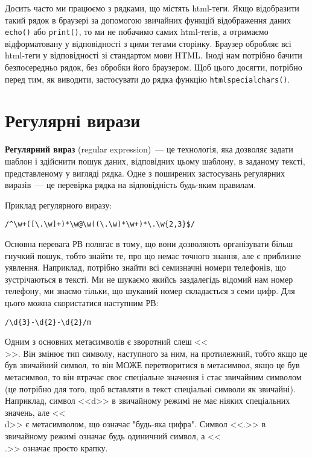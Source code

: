 Досить часто ми працюємо з рядками, що містять html-теги. Якщо відобразити такий рядок в браузері за допомогою звичайних функцій відображення даних \verb'echo()' або \verb'print()', то ми не побачимо самих html-тегів, а отримаємо відформатовану у відповідності з цими тегами сторінку. Браузер обробляє всі html-теги у відповідності зі стандартом мови HTML. Іноді нам потрібно бачити безпосередньо рядок, без обробки його браузером. Щоб цього досягти, потрібно перед тим, як виводити, застосувати до рядка функцію \verb'htmlspecialchars()'.

\pagebreak[3]
\section{Регулярні вирази}
\nopagebreak[4]
\textbf{Регулярний вираз} (regular expression)~--- це технологія, яка дозволяє задати шаблон і здійснити пошук даних, відповідних цьому шаблону, в заданому тексті, представленому у вигляді рядка. Одне з поширених застосувань регулярних виразів~--- це перевірка рядка на відповідність будь-яким правилам.

Приклад регулярного виразу:
\begin{verbatim}
/^\w+([\.\w]+)*\w@\w((\.\w)*\w+)*\.\w{2,3}$/
\end{verbatim}
Основна перевага РВ полягає в тому, що вони дозволяють організувати більш гнучкий пошук, тобто знайти те, про що немає точного знання, але є приблизне уявлення. Наприклад, потрібно знайти всі семизначні номери телефонів, що зустрічаються в тексті. Ми не шукаємо якийсь заздалегідь відомий нам номер телефону, ми знаємо тільки, що шуканий номер складається з семи цифр. Для цього можна скористатися наступним РВ:

\begin{verbatim}
/\d{3}-\d{2}-\d{2}/m
\end{verbatim}

Одним з основних метасимволів є зворотний слеш <<\\>>. Він змінює тип символу, наступного за ним, на протилежний, тобто якщо це був звичайний символ, то він МОЖЕ перетворитися в метасимвол, якщо це був метасимвол, то він втрачає своє спеціальне значення і стає звичайним символом (це потрібно для того, щоб вставляти в текст спеціальні символи як звичайні). Наприклад, символ <<d>> в звичайному режимі не має ніяких спеціальних значень, але <<\\d>> є метасимволом, що означає "будь-яка цифра". Символ <<.>> в звичайному режимі означає будь одиничний символ, а <<\\.>> означає просто крапку.


